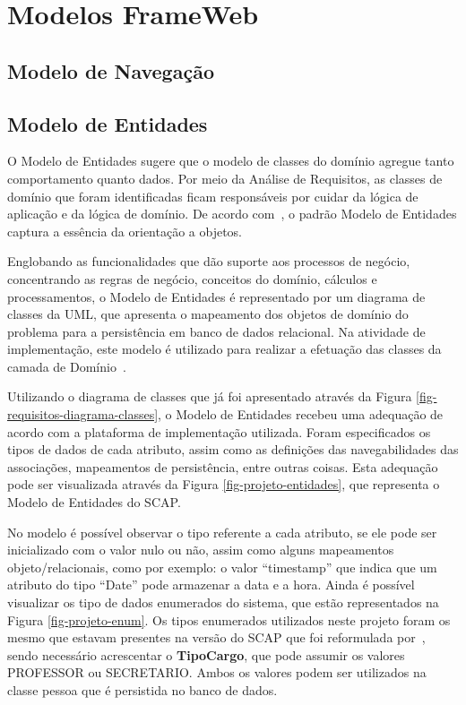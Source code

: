 \section{Modelos FrameWeb}
\label{sec-projeto-modelos-frameweb}

\subsection{Modelo de Navegação}
\label{sec-projeto-modelo-navegacao}

\subsection{Modelo de Entidades}
\label{sec-projeto-modelo-entidades}

O Modelo de Entidades sugere que o modelo de classes do domínio agregue tanto comportamento quanto dados. Por meio da Análise de Requisitos, as classes de domínio que foram identificadas ficam responsáveis por cuidar da lógica de aplicação e da lógica de domínio. De acordo com~, o padrão Modelo de Entidades captura a essência da orientação a objetos.

Englobando as funcionalidades que dão suporte aos processos de negócio, concentrando as regras de negócio, conceitos do domínio, cálculos e processamentos, o Modelo de Entidades é representado por um diagrama de classes da UML, que apresenta o mapeamento dos objetos de domínio do problema para a persistência em banco de dados relacional. Na atividade de implementação, este modelo é utilizado para realizar a efetuação das classes da camada de Domínio~\cite{souza:masterthesis07}.

Utilizando o diagrama de classes que já foi apresentado através da Figura \ref{fig-requisitos-diagrama-classes}, o Modelo de Entidades recebeu uma adequação de acordo com a plataforma de implementação utilizada. Foram especificados os tipos de dados de cada atributo, assim como as definições das navegabilidades das associações, mapeamentos de persistência, entre outras coisas. Esta adequação pode ser visualizada através da Figura \ref{fig-projeto-entidades}, que representa o Modelo de Entidades do SCAP.

No modelo é possível observar o tipo referente a cada atributo, se ele pode ser inicializado com o valor nulo ou não, assim como alguns mapeamentos objeto/relacionais, como por exemplo: o valor ``timestamp'' que indica que um atributo do tipo ``Date'' pode armazenar a data e a hora. Ainda é possível visualizar os tipo de dados enumerados do sistema, que estão representados na Figura \ref{fig-projeto-enum}. Os tipos enumerados utilizados neste projeto foram os mesmo que estavam presentes na versão do SCAP que foi reformulada por~, sendo necessário acrescentar o \textbf{TipoCargo}, que pode assumir os valores PROFESSOR ou SECRETARIO. Ambos os valores podem ser utilizados na classe pessoa que é persistida no banco de dados.   

